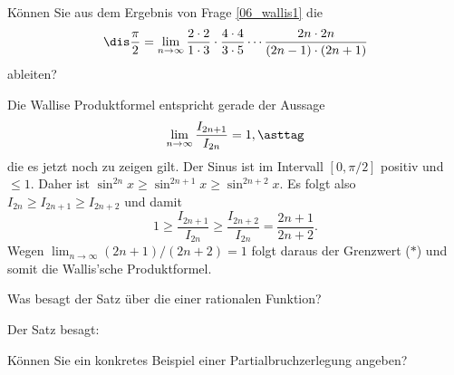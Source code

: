 \begin{frage}\label{06_wallis2}
Können Sie aus dem Ergebnis von Frage \ref{06_wallis1} 
die 
\[
\dis \frac{\pi}{2} = \lim_{n\to\infty} 
\frac{2\cdot2}{1\cdot 3}\cdot
\frac{4\cdot4}{3\cdot 5}\cdots \frac{2n\cdot2n}{(2n-1)\cdot (2n+1)}
\] 
ableiten?
\end{frage}

\begin{antwort}
Die Wallis\sch e Produktformel entspricht gerade der Aussage 
\begin{equation}
\lim_{n\to\infty} \frac{I_{2n+1}}{I_{2n}}=1,\asttag 
\end{equation}
die es jetzt noch zu zeigen gilt. Der Sinus ist im Intervall $[0,\pi/2]$ 
positiv und $\le 1$. Daher ist $\sin^{2n} x \ge \sin^{2n+1}x \ge \sin^{2n+2}x$. 
Es folgt also $I_{2n} \ge I_{2n+1} \ge I_{2n+2}$ und damit
\[
1 \ge \frac{I_{2n+1}}{I_{2n}} \ge \frac{I_{2n+2}}{I_{2n}} = 
\frac{2n+1}{2n+2}.
\]
Wegen $\lim_{n\to \infty} (2n+1)/(2n+2)=1$ 
folgt daraus der Grenzwert ($\ast$) und somit 
die Wallis'sche Produktformel.
\AntEnd
\end{antwort}

\smallskip
\begin{frage}\label{06_pbz}
Was besagt der Satz über die  einer 
rationalen Funktion?
\end{frage}

\begin{antwort}
 Der Satz besagt: 

\medskip
\noindent{}

\smallskip
\end{antwort}

\smallskip
\begin{frage}
Können Sie ein konkretes Beispiel einer Partialbruchzerlegung angeben?
\end{frage}


